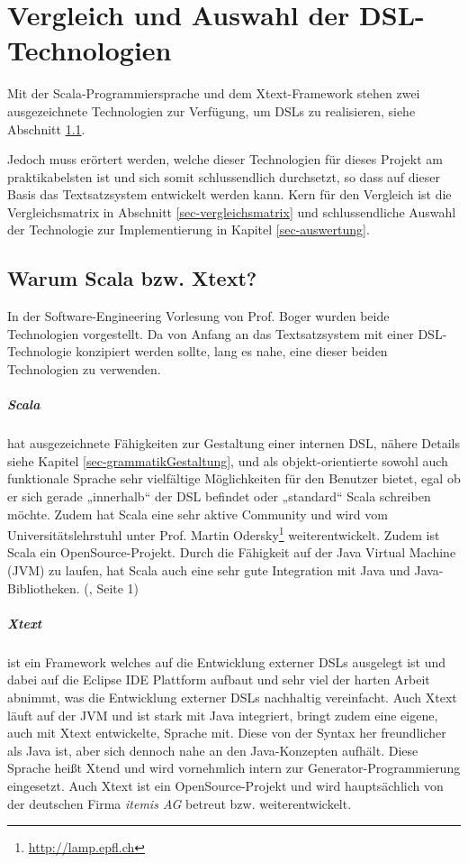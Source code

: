 \chapter{Vergleich und Auswahl der DSL-Technologien}

Mit der Scala-Programmiersprache und dem Xtext-Framework stehen zwei
ausgezeichnete Technologien zur Verfügung, um DSLs zu realisieren, siehe
Abschnitt \ref{sec-warumAusgewaehlt}.

Jedoch muss erörtert werden, welche dieser Technologien für
dieses Projekt am praktikabelsten ist und sich somit schlussendlich durchsetzt,
so dass auf dieser Basis das Textsatzsystem entwickelt werden kann.
Kern für den Vergleich ist die Vergleichsmatrix in Abschnitt
\ref{sec-vergleichsmatrix} und schlussendliche Auswahl der Technologie zur
Implementierung in Kapitel \ref{sec-auswertung}.

\section{Warum Scala bzw. Xtext?}\label{sec-warumAusgewaehlt}

In der Software-Engineering Vorlesung von Prof. Boger wurden beide
Technologien vorgestellt. Da von Anfang an das Textsatzsystem mit einer
DSL-Technologie konzipiert werden sollte, lang es nahe, eine dieser
beiden Technologien zu verwenden.

\paragraph{Scala}
hat ausgezeichnete Fähigkeiten zur Gestaltung einer
internen DSL, nähere Details siehe Kapitel \ref{sec-grammatikGestaltung},
und als objekt-orientierte sowohl auch funktionale Sprache sehr
vielfältige Möglichkeiten für den Benutzer bietet, egal ob er sich
gerade „innerhalb“ der DSL befindet oder „standard“ Scala schreiben
möchte. Zudem hat Scala eine sehr aktive Community und wird vom
Universitätslehrstuhl unter Prof. Martin
Odersky\footnote{\url{http://lamp.epfl.ch}} weiterentwickelt.
Zudem ist Scala ein OpenSource-Projekt.
Durch die Fähigkeit auf der Java Virtual Machine (JVM) zu laufen,
hat Scala auch eine sehr gute Integration mit Java und
Java-Bibliotheken. (\cite{scala-ref}, Seite 1)

\paragraph{Xtext}
ist ein Framework welches auf die Entwicklung externer DSLs
ausgelegt ist und dabei auf die Eclipse IDE Plattform aufbaut
und sehr viel der harten Arbeit abnimmt, was die Entwicklung
externer DSLs nachhaltig vereinfacht.
Auch Xtext läuft auf der JVM und ist stark mit Java integriert, bringt
zudem eine eigene, auch mit Xtext entwickelte, Sprache mit. Diese von der
Syntax her freundlicher als Java ist, aber sich dennoch nahe an den
Java-Konzepten aufhält. Diese Sprache heißt Xtend und wird vornehmlich
intern zur Generator-Programmierung eingesetzt.
Auch Xtext ist ein OpenSource-Projekt und wird hauptsächlich von der
deutschen Firma \emph{itemis AG} betreut bzw. weiterentwickelt. \cite{xtext}

